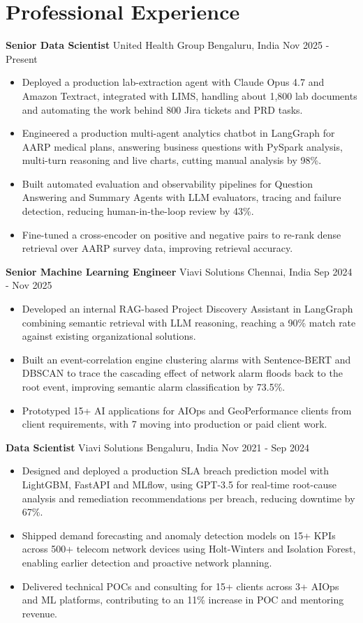 \documentclass[10pt,a4paper]{article}
\newcommand{\role}[4]{\textbf{#1} \textbar{} #2 \hfill #3 \textbar{} #4\par}
\begin{document}
\section{Professional Experience}
\role{Senior Data Scientist}{United Health Group}{Bengaluru, India}{Nov 2025 - Present}
\begin{itemize}
  \item Deployed a production lab-extraction agent with Claude Opus 4.7 and Amazon Textract, integrated with LIMS, handling about 1,800 lab documents and automating the work behind 800 Jira tickets and PRD tasks.
  \item Engineered a production multi-agent analytics chatbot in LangGraph for AARP medical plans, answering business questions with PySpark analysis, multi-turn reasoning and live charts, cutting manual analysis by 98\%.
  \item Built automated evaluation and observability pipelines for Question Answering and Summary Agents with LLM evaluators, tracing and failure detection, reducing human-in-the-loop review by 43\%.
  \item Fine-tuned a cross-encoder on positive and negative pairs to re-rank dense retrieval over AARP survey data, improving retrieval accuracy.
\end{itemize}
\vspace{3pt}
\role{Senior Machine Learning Engineer}{Viavi Solutions}{Chennai, India}{Sep 2024 - Nov 2025}
\begin{itemize}
  \item Developed an internal RAG-based Project Discovery Assistant in LangGraph combining semantic retrieval with LLM reasoning, reaching a 90\% match rate against existing organizational solutions.
  \item Built an event-correlation engine clustering alarms with Sentence-BERT and DBSCAN to trace the cascading effect of network alarm floods back to the root event, improving semantic alarm classification by 73.5\%.
  \item Prototyped 15+ AI applications for AIOps and GeoPerformance clients from client requirements, with 7 moving into production or paid client work.
\end{itemize}
\vspace{3pt}
\role{Data Scientist}{Viavi Solutions}{Bengaluru, India}{Nov 2021 - Sep 2024}
\begin{itemize}
  \item Designed and deployed a production SLA breach prediction model with LightGBM, FastAPI and MLflow, using GPT-3.5 for real-time root-cause analysis and remediation recommendations per breach, reducing downtime by 67\%.
  \item Shipped demand forecasting and anomaly detection models on 15+ KPIs across 500+ telecom network devices using Holt-Winters and Isolation Forest, enabling earlier detection and proactive network planning.
  \item Delivered technical POCs and consulting for 15+ clients across 3+ AIOps and ML platforms, contributing to an 11\% increase in POC and mentoring revenue.
\end{itemize}
\end{document}
